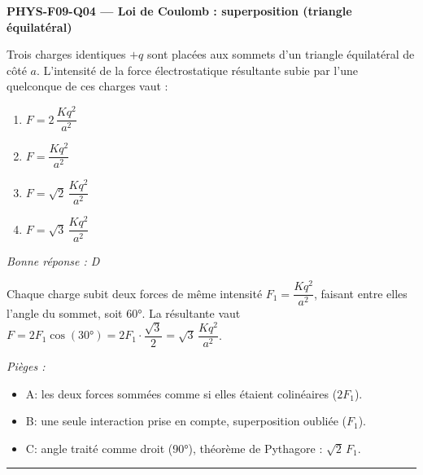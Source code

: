 \documentclass[11pt,a4paper]{article}
\begin{document}
\noindent\textbf{PHYS-F09-Q04 --- Loi de Coulomb : superposition (triangle équilatéral)}\par
Trois charges identiques $+q$ sont placées aux sommets d'un triangle équilatéral de côté $a$. L'intensité de la force électrostatique résultante subie par l'une quelconque de ces charges vaut :
\begin{center}
\end{center}
\begin{enumerate}[label=\Alph*)]
\item $F=2\,\dfrac{Kq^{2}}{a^{2}}$
\item $F=\dfrac{Kq^{2}}{a^{2}}$
\item $F=\sqrt{2}\,\dfrac{Kq^{2}}{a^{2}}$
\item $F=\sqrt{3}\,\dfrac{Kq^{2}}{a^{2}}$
\end{enumerate}
\textit{Bonne réponse : D}\par
Chaque charge subit deux forces de même intensité $F_1=\dfrac{Kq^{2}}{a^{2}}$, faisant entre elles l'angle du sommet, soit \ang{60}. La résultante vaut $F=2F_1\cos\!\left(\ang{30}\right)=2F_1\cdot\dfrac{\sqrt{3}}{2}=\sqrt{3}\,\dfrac{Kq^{2}}{a^{2}}$.\par
\textit{Pièges :}
\begin{itemize}
\item A: les deux forces sommées comme si elles étaient colinéaires ($2F_1$).
\item B: une seule interaction prise en compte, superposition oubliée ($F_1$).
\item C: angle traité comme droit (\ang{90}), théorème de Pythagore : $\sqrt{2}\,F_1$.
\end{itemize}
\vspace{8pt}\hrule\vspace{8pt}
\end{document}
